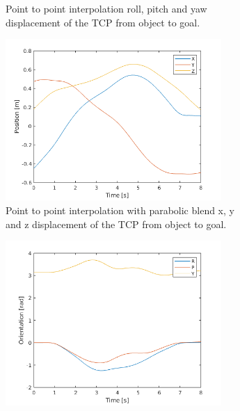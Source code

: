 \documentclass[../main.tex]{subfiles}
\begin{document}
\begin{figure}[H]
\begin{subfigure}[t]{0.49\textwidth}
        \caption{Point to point interpolation roll, pitch and yaw displacement of the TCP from object to goal.}
        \label{subfig:p2p_rpy}
    \end{subfigure}
    \begin{subfigure}[t]{0.49\textwidth}
        \centering
        \captionsetup{width=.9\textwidth}
        \includegraphics[width=0.9\textwidth]{figures/p2p_interpolation/joint_space_int_with_blend_position.png}
        \caption{Point to point interpolation with parabolic blend x, y and z displacement of the TCP from object to goal.}
        \label{subfig:p2p_parabolic_xyz}
    \end{subfigure}
    \begin{subfigure}[t]{0.49\textwidth}
        \centering
        \captionsetup{width=.9\textwidth}
        \includegraphics[width=0.9\textwidth]{figures/p2p_interpolation/joint_space_int_with_blend_orientation.png}

\end{subfigure}
\end{figure}
\end{document}
